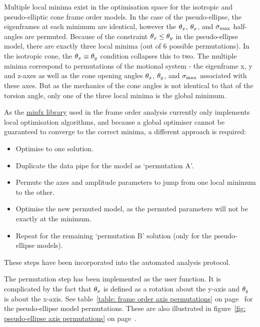 Multiple local minima exist in the optimisation space for the isotropic and pseudo-elliptic cone frame order models.
In the case of the pseudo-ellipse, the eigenframes at each minimum are identical, however the $\theta_x$, $\theta_x$, and $\sigma_{\textrm{max}}$ half-angles are permuted.
Because of the constraint $\theta_x \le \theta_y$ in the pseudo-ellipse model, there are exactly three local minima (out of 6 possible permutations).
In the isotropic cone, the $\theta_x \equiv \theta_y$ condition collapses this to two.
The multiple minima correspond to permutations of the motional system - the eigenframe x, y and z-axes as well as the cone opening angles $\theta_x$, $\theta_y$, and $\sigma_{\textrm{max}}$ associated with these axes.
But as the mechanics of the cone angles is not identical to that of the torsion angle, only one of the three local minima is the global minimum.

As the \href{https://sourceforge.net/projects/minfx/}{minfx library} used in the frame order analysis currently only implements local optimisation algorithms, and because a global optimiser cannot be guaranteed to converge to the correct minima, a different approach is required:
\begin{itemize}
    \item Optimise to one solution.
    \item Duplicate the data pipe for the model as `permutation A'.
    \item Permute the axes and amplitude parameters to jump from one local minimum to the other.
    \item Optimise the new permuted model,  as the permuted parameters will not be exactly at the minimum.
    \item Repeat for the remaining `permutation B' solution (only for the pseudo-ellipse models).
\end{itemize}

These steps have been incorporated into the automated analysis protocol.

The permutation step has been implemented as the  user function.
It is complicated by the fact that $\theta_x$ is defined as a rotation about the y-axis and $\theta_y$ is about the x-axis.
See table~\ref{table: frame order axis permutations} on page~\pageref{table: frame order axis permutations} for the pseudo-ellipse model permutations.
These are also illustrated in figure~\ref{fig: pseudo-ellipse axis permutations} on page~\pageref{fig: pseudo-ellipse axis permutations}.


